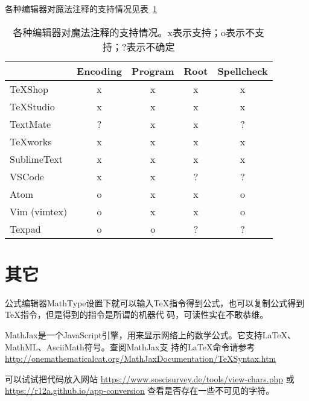 各种编辑器对魔法注释的支持情况见表~\ref{magiccommands}
\begin{table}
  \centering
  \caption{各种编辑器对魔法注释的支持情况。x表示支持；o表示不支持；?表示不确定}\label{magiccommands}
  \begin{tabular}{|l|*{4}{c|}}
    \hline
    & Encoding & Program & Root & Spellcheck \\
    \hline
    TeXShop & x  & x & x & x \\
    \hline
    TeXStudio & x & x & x & x \\
    \hline
    TextMate & ? & x & x & ? \\
    \hline
    TeXworks & x & x & x & x \\
    \hline
    SublimeText  & x & x & x & x \\ 
    \hline
    VSCode & x & x & ? & ? \\
    \hline
    Atom & o & x & x & o \\
    \hline
    Vim
    (vimtex) & o & x & x & o \\ 
    \hline
    Texpad & o & o & ? & ? \\
    \hline
  \end{tabular}
\end{table}

\section{其它}




公式编辑器MathType设置下就可以输入TeX指令得到公式，也可以复制公式得到TeX指令，但是得到的指令是所谓的机器代
码，可读性实在不敢恭维。

MathJax是一个JavaScript引擎，用来显示网络上的数学公式。它支持LaTeX、MathML、AsciiMath符号。查阅MathJax支
持的LaTeX命令请参考 \url{http://onemathematicalcat.org/MathJaxDocumentation/TeXSyntax.htm}

可以试试把代码放入网站 \url{https://www.soscisurvey.de/tools/view-chars.php} 或 \url{https://r12a.github.io/app-conversion} 查看是否存在一些不可见的字符。